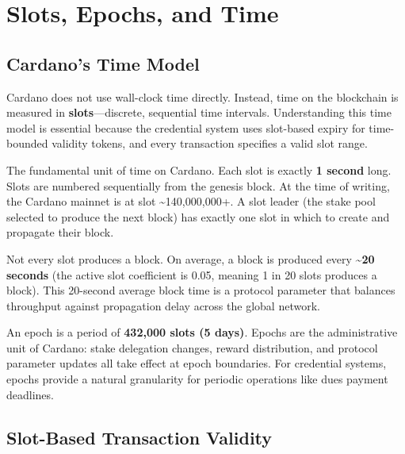 \section{Slots, Epochs, and Time}
\label{sec:time}

\subsection{Cardano's Time Model}

Cardano does not use wall-clock time directly. Instead, time on the
blockchain is measured in \textbf{slots}---discrete, sequential time
intervals. Understanding this time model is essential because the
credential system uses slot-based expiry for time-bounded validity
tokens, and every transaction specifies a valid slot range.

\begin{description}[leftmargin=2.2cm, labelwidth=2cm]
  \item[Slot] The fundamental unit of time on Cardano. Each slot is
    exactly \textbf{1 second} long. Slots are numbered sequentially from
    the genesis block. At the time of writing, the Cardano mainnet is at
    slot \textasciitilde140,000,000+. A slot leader (the stake pool
    selected to produce the next block) has exactly one slot in which to
    create and propagate their block.

  \item[Block] Not every slot produces a block. On average, a block is
    produced every \textbf{\textasciitilde20 seconds} (the active slot
    coefficient is 0.05, meaning 1 in 20 slots produces a block). This
    20-second average block time is a protocol parameter that balances
    throughput against propagation delay across the global network.

  \item[Epoch] An epoch is a period of \textbf{432,000 slots (5 days)}.
    Epochs are the administrative unit of Cardano: stake delegation
    changes, reward distribution, and protocol parameter updates all
    take effect at epoch boundaries. For credential systems, epochs
    provide a natural granularity for periodic operations like dues
    payment deadlines.
\end{description}

\subsection{Slot-Based Transaction Validity}

